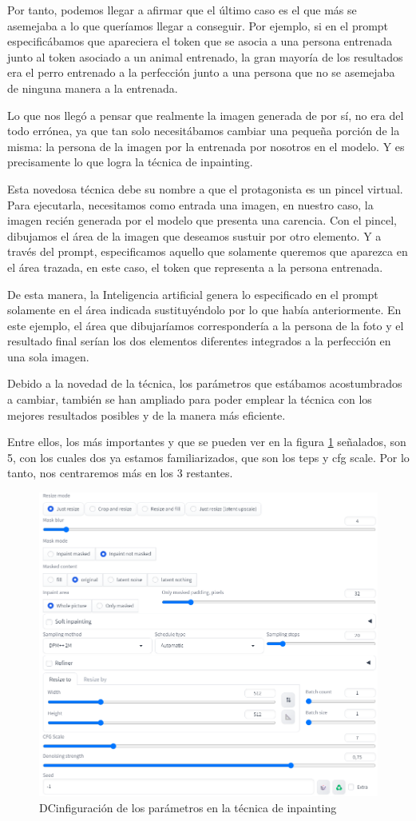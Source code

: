 Por tanto, podemos llegar a afirmar que el último caso es el que más se asemejaba a lo que queríamos llegar a conseguir. Por ejemplo, si en el prompt especificábamos que apareciera el token que se asocia a una persona entrenada junto al token asociado a un animal entrenado, la gran mayoría de los resultados era el perro entrenado a la perfección junto a una persona que no se asemejaba de ninguna manera a la entrenada.  

Lo que nos llegó a pensar que realmente la imagen generada de por sí, no era del todo errónea, ya que tan solo necesitábamos cambiar una pequeña porción de la misma: la persona de la imagen por la entrenada por nosotros en el modelo. Y es precisamente lo que logra la técnica de inpainting. 

Esta novedosa técnica debe su nombre a que el protagonista es un pincel virtual. Para ejecutarla, necesitamos como entrada una imagen, en nuestro caso, la imagen recién generada por el modelo que presenta una carencia. Con el pincel, dibujamos el área de la imagen que deseamos sustuir por otro elemento. Y a través del prompt, especificamos aquello que solamente queremos que aparezca en el área trazada, en este caso, el token que representa a la persona entrenada. 

De esta manera, la Inteligencia artificial genera lo especificado en el prompt solamente en el área indicada sustituyéndolo por lo que había anteriormente. En este ejemplo, el área que dibujaríamos correspondería a la persona de la foto y el resultado final serían los dos elementos diferentes integrados a la perfección en una sola imagen. 

Debido a la novedad de la técnica, los parámetros que estábamos acostumbrados a cambiar, también se han ampliado para poder emplear la técnica con los mejores resultados posibles y de la manera más eficiente. 

Entre ellos, los más importantes y que se pueden ver en la figura \ref{fig:paramsinpainting} señalados, son 5, con los cuales dos ya estamos familiarizados, que son los teps y cfg scale. Por lo tanto, nos centraremos más en los 3 restantes. 

\begin{figure}[h]
	\centering
	\includegraphics[width = 0.6
	\textwidth]{Imagenes/Vectorial/parametrosinpainting.png}
	\caption{DCinfiguración de los parámetros en la técnica de inpainting}
	\label{fig:paramsinpainting}
\end{figure}

